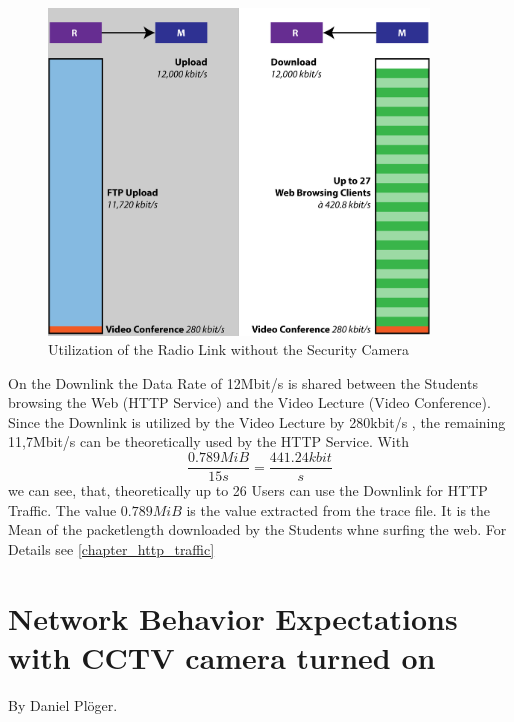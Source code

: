 \documentclass[a4paper,10pt]{book}\usepackage{graphicx}
\begin{document}
\begin{figure}[!ht]
  \centering
    \includegraphics[width=0.9\textwidth]{graphics-02.png}
    
    \caption{Utilization of the Radio Link without the Security Camera}
\end{figure}

On the Downlink the Data Rate of 12Mbit/s is shared between the Students browsing the Web (HTTP Service) and the Video Lecture (Video Conference).
Since the Downlink is utilized by the Video Lecture by 280kbit/s , the remaining 11,7Mbit/s 
can be theoretically used by the HTTP Service. With 
\begin{equation}
 \frac{0.789MiB}{15s}=\frac{441.24kbit}{s}
\end{equation}
we can see, that, theoretically up to 26 Users can use the Downlink for HTTP Traffic.
The value $0.789MiB$ is the value extracted from the trace file. It is the Mean of the packetlength downloaded by the Students whne surfing the web. For Details see \ref{chapter_http_traffic}

\section{Network Behavior Expectations with CCTV camera turned on}
\label{chapter_expectations}
By Daniel Plöger.\\
\end{document}
